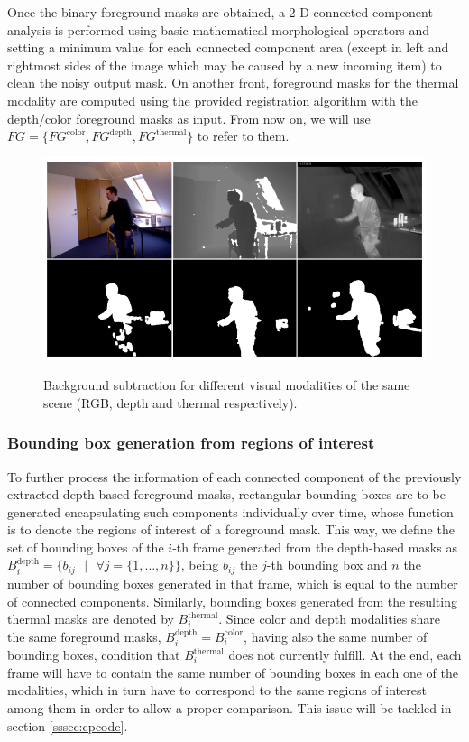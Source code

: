 \documentclass[10pt,twocolumn,letterpaper]{article}
\begin{document}
Once the binary foreground masks are obtained, a 2-D connected component analysis is performed using basic mathematical morphological operators and setting a minimum value for each connected component area (except in left and rightmost sides of the image which may be caused by a new incoming item) to clean the noisy output mask. On another front, foreground masks for the thermal modality are computed using the provided registration algorithm with the depth/color foreground masks as input. From now on, we will use $FG = \{FG^\mathrm{color}, FG^\mathrm{depth}, FG^\mathrm{thermal}\}$ to refer to them. 
 
 \begin{figure}[!h]
{\includegraphics[width=\linewidth]{bs.eps}}
\caption{Background subtraction for different visual
modalities of the same scene (RGB, depth and thermal respectively).
\label{fig:bscomparison}}
\end{figure}

\subsubsection{Bounding box generation from regions of interest}
\label{sssec:bbgen}
To further process the information of each connected component of the previously extracted depth-based foreground masks, rectangular bounding boxes are to be generated encapsulating such components individually over time, whose function is to denote the regions of interest of a foreground mask. This way, we define the set of bounding boxes of the $i$-th frame generated from the depth-based masks as $B^\mathrm{depth}_i = \{b_{ij}\text{ }|\text{ }\forall j = \{1, \ldots, n\} \}$, being $b_{ij}$ the $j$-th bounding box and $n$ the number of bounding boxes generated in that frame, which is equal to the number of connected components. Similarly, bounding boxes generated from the resulting thermal masks are denoted by $B^\mathrm{thermal}_i$. Since color and depth modalities share the same foreground masks, $B^\mathrm{depth}_i = B^\mathrm{color}_i$, having also the same number of bounding boxes, condition that $B^\mathrm{thermal}_i$ does not currently fulfill. At the end, each frame will have to contain the same number of bounding boxes in each one of the modalities, which in turn have to correspond to the same regions of interest among them in order to allow a proper comparison. This issue will be tackled in section \ref{sssec:cpcode}.
\end{document}

